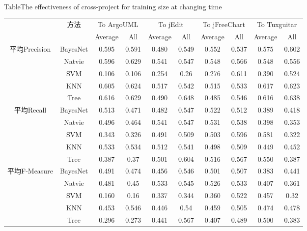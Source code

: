 \begin{table} [htbp]
{Table$\!$}{The effectiveness of cross-project for training size at changing time}
\vspace{0.5em}
\centering
\footnotesize
\begin{tabular}{cccccccccc}
\toprule[1.5pt]
~\multirow{2}{*}{指标}&\multirow{2}{*}{方法}&\multicolumn{2}{c}{To ArgoUML}&\multicolumn{2}{c}{To jEdit}&\multicolumn{2}{c}{To jFreeChart}&\multicolumn{2}{c}{To  Tuxguitar}\\
\cline{3-10}
~&~&{Average}&{All}&{Average}&{All}&{Average}&{All}&{Average}&{All}\\
\midrule[1pt]
\multirow{5}{*}{平均Precision}
&BayesNet&	0.595&	0.591&0.480&	0.549&	0.552&	0.537&	0.575&	0.602\\
&Natvie&	0.596&	0.629	&0.541&	0.547&	0.548&	0.566&	0.548&	0.556\\
&SVM&	0.106&	0.106&	0.254&	0.26&	0.276	&0.611&	0.390&	0.524\\
&KNN&	0.605&	0.624&	0.517&	0.542&	0.515&	0.533&	0.617&	0.623\\
&Tree	&0.616&	0.629&	0.490&	0.648&	0.485	&0.546	&0.616	&0.638\\
\hline
\multirow{5}{*}{平均Recall}								
&BayesNet&	0.513&	0.471&	0.482&	0.547&	0.522	&0.512&	0.389	&0.418\\
&Natvie&	0.496&	0.464&	0.541	&0.547&0.531	&0.538&0.398	&0.353\\
&SVM&	0.343&	0.326&	0.491&	0.509&	0.503&	0.596&	0.581&	0.322\\
&KNN&	0.533&	0.534&	0.512	&0.541&	0.498&	0.509&	0.449&	0.452\\
&Tree	&0.387&	0.37&	0.501	&0.604&	0.516&	0.567&	0.550&	0.387\\
\hline
\multirow{5}{*}{平均F-Measure}								
&BayesNet&	0.491	&0.474&	0.456&	0.546	&0.501&	0.507&	0.383	&0.441\\
&Natvie&	0.481&	0.45&	0.533&	0.545&	0.526&	0.533&	0.407&	0.361\\
&SVM&	0.160	&0.16	&0.337	&0.344	&0.360	&0.522	&0.457	&0.32\\
&KNN&	0.453&	0.546	&0.446&	0.54&	0.459	&0.505	&0.474&	0.478\\
&Tree&	0.296	&0.273	&0.441&	0.567	&0.407&	0.489	&0.500&	0.383\\
\bottomrule[1.5pt]
\end{tabular}
\end{table}

